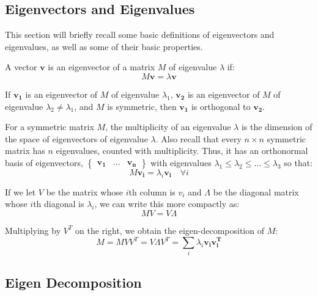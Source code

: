 \subsection{Eigenvectors and Eigenvalues}
\label{eigenvectors}
This section will briefly recall some basic definitions of eigenvectors and
eigenvalues, as well as some of their basic properties.

A vector $\mathbf{v}$ is an eigenvector of a matrix $M$ of eigenvalue $\lambda$
if:
\begin{equation}
M\mathbf{v} = \lambda\textbf{v}
\end{equation}

If $\mathbf{v_1}$ is an eigenvector of $M$ of eigenvalue $\lambda_1$,
$\mathbf{v_2}$ is an eigenvector of $M$ of eigenvalue $\lambda_2 \neq
\lambda_1$, and $M$ is symmetric, then $\mathbf{v_1}$ is orthogonal to
$\mathbf{v_2}$.

For a symmetric matrix $M$, the multiplicity of an eigenvalue $\lambda$ is the
dimension of the space of eigenvectors of eigenvalue $\lambda$. Also recall that
every $n \times n$ symmetric matrix has $n$ eigenvalues, counted with
multiplicity. Thus, it has an orthonormal basis of eigenvectors,
$\begin{Bmatrix} \mathbf{v_1} & \ldots & \mathbf{v_n} \end{Bmatrix}$ with
eigenvalues $\lambda_1 \leq \lambda_2 \leq \ldots \leq \lambda_3$ so that:
\begin{equation}
M\mathbf{v_i} = \lambda_i \mathbf{v_i} \quad \forall i
\end{equation}

If we let $V$ be the matrix whose $i$th column is $v_i$ and $\Lambda$ be the
diagonal matrix whose $i$th diagonal is $\lambda_i$, we can write this more
compactly as:
\begin{equation}
MV = V\Lambda
\end{equation}

Multiplying by $V^T$ on the right, we obtain the eigen-decomposition of $M$:
\begin{equation}
M = MVV^T = V{\Lambda}V^T = \sum_i \lambda_i\mathbf{v_i}\mathbf{v_i^T}
\end{equation}

\subsection{Eigen Decomposition}
\label{eigenDecomposition}

